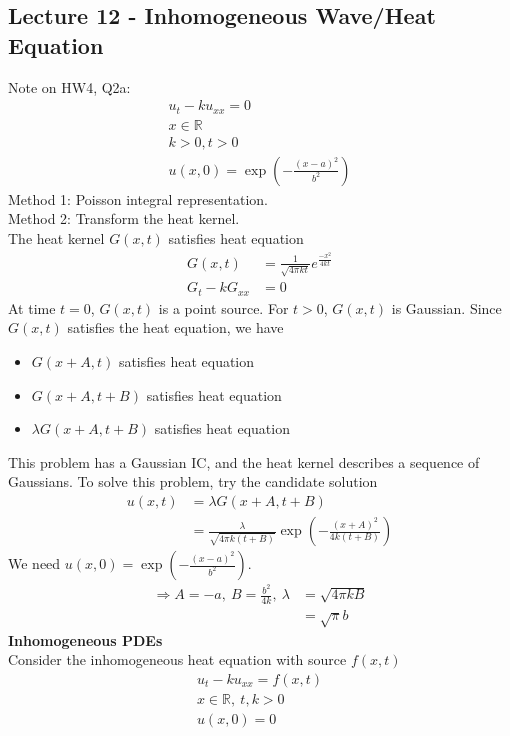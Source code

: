 \documentclass[12pt, letterpaper]{article}
\begin{document}
\subsection{Lecture 12 - Inhomogeneous Wave/Heat Equation} 
Note on HW4, Q2a:
\begin{align*}
    u_t - ku_{xx} = 0 \\
    x \in \mathbb{R} \\
    k > 0, t > 0 \\
    u(x,0) = \exp\left(-\frac{(x-a)^2}{b^2}\right)
\end{align*}
Method 1: Poisson integral representation. \\
Method 2: Transform the heat kernel. \\
The heat kernel $G(x,t)$ satisfies heat equation
\begin{align*}
    G(x,t) &= \frac{1}{\sqrt{4\pi kt}}e^{\frac{-x^2}{4kt}} \\
    G_t - kG_{xx} &= 0
\end{align*}
At time $t = 0$, $G(x,t)$ is a point source. For $t > 0$, $G(x,t)$ is Gaussian. Since $G(x,t)$
satisfies the heat equation, we have 
\begin{itemize}
    \item $G(x+A,t)$ satisfies heat equation
    \item $G(x+A,t+B)$ satisfies heat equation
    \item $\lambda G(x+A,t+B)$ satisfies heat equation
\end{itemize}
This problem has a Gaussian IC, and the heat kernel describes a sequence of Gaussians.
To solve this problem, try the candidate solution
\begin{align*}
    u(x,t) &= \lambda G(x+A,t+B) \\
    &= \frac{\lambda}{\sqrt{4\pi k (t+B)}}\exp\left( -\frac{(x+A)^2}{4k(t+B)} \right)
\end{align*}
We need $u(x,0) = \exp\left(-\frac{(x-a)^2}{b^2}\right)$.
\begin{align*}
    \Rightarrow A = -a,\ B = \frac{b^2}{4k},\ \lambda &= \sqrt{4\pi k B} \\
    &= \sqrt{\pi}b
\end{align*}
\textbf{Inhomogeneous PDEs} \\
Consider the inhomogeneous heat equation with source $f(x,t)$
\begin{align*}
    u_t - ku_{xx} = f(x,t) \\
    x\in \mathbb{R},\ t,k > 0 \\
    u(x,0) = 0
\end{align*}
\end{document}
